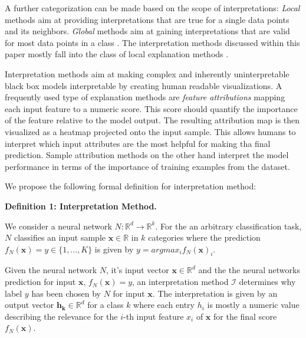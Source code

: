  A further categorization can be made based on the scope of interpretations: \textit{Local} methods aim at providing interpretations that are true for a single data points and its neighbors. 
\textit{Global} methods aim at gaining interpretations that are valid for most data points in a class \cite{kim2018interpretability, nguyen2017plug, yosinski2015understanding}. The interpretation methods discussed within this paper mostly fall into the class of local explanation methods \cite{ribeiro2016should, lundberg2017unified, bach2015pixel}. %

 Interpretation methods aim at making complex and inherently uninterpretable black box models interpretable by creating human readable visualizations. 
A frequently used type of explanation methods are \textit{feature attributions} mapping each input feature to a numeric score. This score should quantify the importance of the feature relative to the model output. The resulting attribution map is then visualized as a heatmap projected onto the input sample. This allows humans to interpret which input attributes are the most helpful for making tha final prediction. Sample attribution methods on the other hand interpret the model performance in terms of the importance of training examples from the dataset. 

We propose the following formal definition for interpretation method:\newline

\textbf{Definition 1: Interpretation Method.}

\setlength{\leftskip}{0.39cm}

  \noindent We consider a neural network $N: \mathbb{R}^d \to \mathbb{R}^k$. For the an arbitrary classification task, $N$ classifies an input sample $\mathbf{x}\in \mathbb{R}$ in $k$ categories where the prediction $f_N(\mathbf{x})=y \in \{1, ..., K\}$ is given by $y = arg max_i f_N(\mathbf{x})_i$.

  Given the neural network $N$, it's input vector $\mathbf{x} \in \mathbb{R}^d$ and the the neural networks prediction for input $\mathbf{x}$, $f_N(\mathbf{x})=y$, an interpretation method $\mathcal{I}$ determines why label $y$ has been chosen by $N$ for input $\mathbf{x}$. 
  The interpretation is given by an output vector $\mathbf{h_k} \in \mathbb{R}^d$ for a class $k$ where each entry $h_i$ is mostly a numeric value describing the relevance for the $i$-th input feature $x_i$ of $\mathbf{x}$ for the final score $f_N(\mathbf{x})$.

